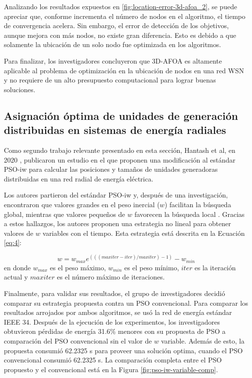 \documentclass[letterpaper]{report}
\begin{document}
    Analizando los resultados expuestos en \ref{fig:location-error-3d-afoa_2},
    se puede apreciar que, conforme incrementa el número de nodos en el
    algoritmo, el tiempo de convergencia acelera. Sin embargo, el
    error de detección de los objetivos, aunque mejora con más nodos, no existe
    gran diferencia. Esto es debido a que solamente la ubicación de un solo nodo
    fue optimizada en los algoritmos. 

    Para finalizar, los investigadores concluyeron que 3D-AFOA es altamente
    aplicable al problema de optimización en la ubicación de nodos en una red
    WSN y no requiere de un alto presupuesto computacional para lograr buenas
    soluciones. 

  \subsection{Asignación óptima de unidades de generación distribuidas en
    sistemas de energía radiales}
    Como segundo trabajo relevante presentado en esta sección, Hantash et al,
    en 2020 \cite{PSOEnergy}, publicaron un estudio en el que
    proponen una modificación al estándar PSO-iw para calcular las posiciones y
    tamaños de unidades generadoras distribuidas en una red radial de energía
    eléctrica. 

    Los autores partieron del estándar PSO-iw y, después de una investigación,
    encontraron que valores grandes en el peso inercial ($w$) facilitan la
    búsqueda global, mientras que valores pequeños de $w$ favorecen la búsqueda
    local \cite{CPSO, APSO2016}. Gracias a estos hallazgos, los autores proponen
    una estrategia no
    lineal para obtener valores de $w$ variables con el tiempo. Esta estrategia
    está descrita en la Ecuación \ref{eq:4}:

    \begin{equation}
      \label{eq:4}
      w = w_{max} e^{(((maxiter - iter) / maxiter) - 1)} - w_{min} 
    \end{equation}
    en donde $w_{max}$ es el peso máximo, $w_{min}$ es el peso mínimo, $iter$ es
    la iteración actual y $maxiter$ es el número máximo de iteraciones.

    Finalmente, para validar sus resultados, el grupo de investigadores
    decidió comparar su
    estrategia propuesta contra un PSO convencional. Para comparar los
    resultados arrojados por ambos algoritmos, se usó la red de energía estándar
    IEEE 34. Después de la ejecución de los experimentos, los investigadores
    obtuvieron pérdidas de energía 31.6\% menores con su propuesta de PSO a
    comparación del PSO convencional sin el valor de $w$ variable. Además de
    esto, la propuesta consumió 62.2325 s para proveer una solución optima,
    cuando el PSO convencional consumió 62.2325 s. La comparación completa
    entre el PSO propuesto y el convencional está en la Figura
    \ref{fig:pso-iw-variable-comp}.
\end{document}
